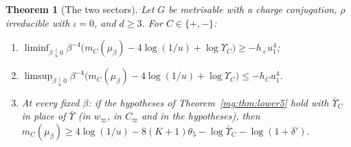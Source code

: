 \documentclass[11pt,a4paper]{article}
\newtheorem{theorem}{Theorem}[section]
\theoremstyle{definition}
\theoremstyle{remark}
\begin{document}
\begin{theorem}[The two sectors]\label{mg:thm:sectors}
Let $G$ be metrisable with a charge conjugation, $\rho$ irreducible with $\iota=0$, and $d\ge3$. For $C\in\{+,-\}$:
\begin{enumerate}[label=(\roman*)]
\item $\liminf_{\beta\downarrow0}\beta^{-4}\bigl(m_C(\mu_\beta)-4\log(1/u)+\log\Upsilon_C\bigr)\ge-h_+u_1^4$;
\item $\limsup_{\beta\downarrow0}\beta^{-4}\bigl(m_C(\mu_\beta)-4\log(1/u)+\log\Upsilon_C\bigr)\le-h_Cu_1^4$.
\item At every fixed $\beta$: if the hypotheses of Theorem~\ref{mg:thm:lower5} hold with $\bar\Upsilon_C$ in place of $\bar\Upsilon$ (in $w_\varpi$, in $C_\varpi$ and in the hypotheses), then
$m_C(\mu_\beta)\ge4\log(1/u)-8(K+1)\theta_5-\log\bar\Upsilon_C-\log(1+\delta')$.
\end{enumerate}
\end{theorem}
\end{document}
